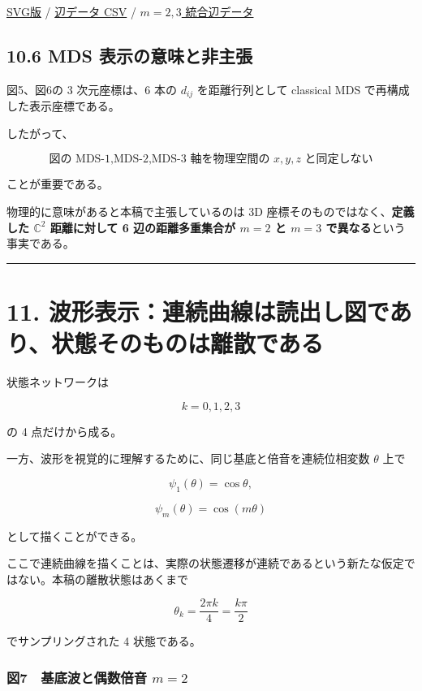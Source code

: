 \documentclass[
  a4paper,
]{ltjsarticle}
\begin{document}
\href{K4_complete_network_m3.svg}{SVG版} / \href{edges_m3.csv}{辺データ
CSV} / \href{all_edges_m2_m3.csv}{\(m=2,3\) 統合辺データ}

\subsection{10.6 MDS
表示の意味と非主張}\label{mds-ux8868ux793aux306eux610fux5473ux3068ux975eux4e3bux5f35}

図5、図6の 3 次元座標は、6 本の \(d_{ij}\) を距離行列として classical
MDS で再構成した表示座標である。

したがって、

\[
\boxed{
\text{図の MDS-1,MDS-2,MDS-3 軸を物理空間の }x,y,z\text{ と同定しない}
}
\]

ことが重要である。

物理的に意味があると本稿で主張しているのは 3D
座標そのものではなく、\textbf{定義した \(\mathbb C^2\) 距離に対して 6
辺の距離多重集合が \(m=2\) と \(m=3\) で異なる}という事実である。

\begin{center}\rule{0.5\linewidth}{0.5pt}\end{center}

\section{11.
波形表示：連続曲線は読出し図であり、状態そのものは離散である}\label{ux6ce2ux5f62ux8868ux793aux9023ux7d9aux66f2ux7ddaux306fux8aadux51faux3057ux56f3ux3067ux3042ux308aux72b6ux614bux305dux306eux3082ux306eux306fux96e2ux6563ux3067ux3042ux308b}

状態ネットワークは

\[
k=0,1,2,3
\]

の 4 点だけから成る。

一方、波形を視覚的に理解するために、同じ基底と倍音を連続位相変数
\(\theta\) 上で

\[
\psi_1(\theta)=\cos\theta,
\]

\[
\psi_m(\theta)=\cos(m\theta)
\]

として描くことができる。

ここで連続曲線を描くことは、実際の状態遷移が連続であるという新たな仮定ではない。本稿の離散状態はあくまで

\[
\theta_k
=
\frac{2\pi k}{4}
=
\frac{k\pi}{2}
\]

でサンプリングされた 4 状態である。

\subsubsection{\texorpdfstring{図7　基底波と偶数倍音
\(m=2\)}{図7　基底波と偶数倍音 m=2}}\label{ux56f37-ux57faux5e95ux6ce2ux3068ux5076ux6570ux500dux97f3-m2}
\end{document}
